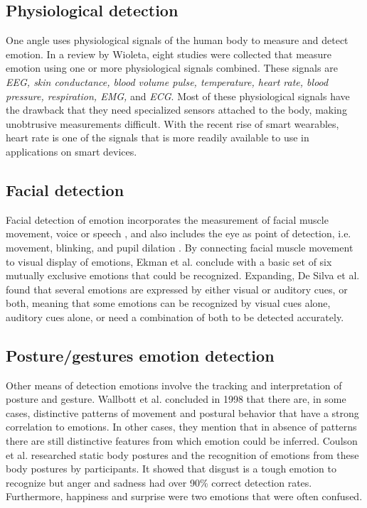 \documentclass{sigchi}
\begin{document}
\subsection{Physiological detection} %
\label{sub:physiology}
One angle uses physiological signals of the human body to measure and detect emotion. In a review by Wioleta\cite{Wioleta2013}, eight studies were collected that measure emotion using one or more physiological signals combined. These signals are \textit{EEG, skin conductance, blood volume pulse, temperature, heart rate, blood pressure, respiration, EMG,} and \textit{ECG}. Most of these physiological signals have the drawback that they need specialized sensors attached to the body, making unobtrusive measurements difficult. With the recent rise of smart wearables, heart rate is one of the signals that is more readily available to use in applications on smart devices.

\subsection{Facial detection} %
\label{sub:facial_detection}
Facial detection of emotion incorporates the measurement of facial muscle movement, voice or speech \cite{Ververidis2004}, and also includes the eye as point of detection, i.e. movement, blinking, and pupil dilation \cite{Soleymani2015}. By connecting facial muscle movement to visual display of emotions, Ekman et al. \cite{Ekman1969} conclude with a basic set of six mutually exclusive emotions that could be recognized. Expanding, De Silva et al. \cite{Silva1997} found that several emotions are expressed by either visual or auditory cues, or both, meaning that some emotions can be recognized by visual cues alone, auditory cues alone, or need a combination of both to be detected accurately.

\subsection{Posture/gestures emotion detection}
Other means of detection emotions involve the tracking and interpretation of posture and gesture. Wallbott et al. \cite{Wallbott1998} concluded in 1998 that there are, in some cases, distinctive patterns of movement and postural behavior that have a strong correlation to emotions. In other cases, they mention that in absence of patterns there are still distinctive features from which emotion could be inferred. Coulson et al. \cite{Coulson2004} researched static body postures and the recognition of emotions from these body postures by participants. It showed that disgust is a tough emotion to recognize but anger and sadness had over 90\% correct detection rates. Furthermore, happiness and surprise were two emotions that were often confused. 
\end{document}
